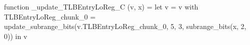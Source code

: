 function _update_TLBEntryLoReg_C (v, x) = let v = { v with TLBEntryLoReg_chunk_0 = update_subrange_bits(v.TLBEntryLoReg_chunk_0, 5, 3, subrange_bits(x, 2, 0)) } in
  v
